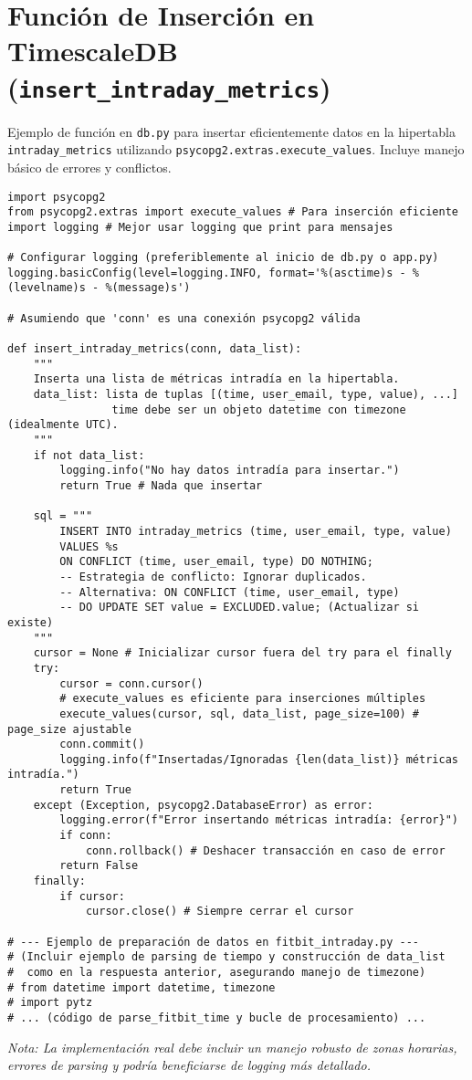 \section{Función de Inserción en TimescaleDB (\texttt{insert\_intraday\_metrics})}
\label{annex:code:insert_intraday}
Ejemplo de función en \texttt{db.py} para insertar eficientemente datos en la hipertabla \texttt{intraday\_metrics} utilizando \texttt{psycopg2.extras.execute\_values}. Incluye manejo básico de errores y conflictos.
\begin{lstlisting}[caption={Ejemplo de función de inserción masiva en TimescaleDB (\texttt{db.py}).}, label={lst:insert_intraday_code}]
import psycopg2
from psycopg2.extras import execute_values # Para inserción eficiente
import logging # Mejor usar logging que print para mensajes

# Configurar logging (preferiblemente al inicio de db.py o app.py)
logging.basicConfig(level=logging.INFO, format='%(asctime)s - %(levelname)s - %(message)s')

# Asumiendo que 'conn' es una conexión psycopg2 válida

def insert_intraday_metrics(conn, data_list):
    """
    Inserta una lista de métricas intradía en la hipertabla.
    data_list: lista de tuplas [(time, user_email, type, value), ...]
                time debe ser un objeto datetime con timezone (idealmente UTC).
    """
    if not data_list:
        logging.info("No hay datos intradía para insertar.")
        return True # Nada que insertar

    sql = """
        INSERT INTO intraday_metrics (time, user_email, type, value)
        VALUES %s
        ON CONFLICT (time, user_email, type) DO NOTHING;
        -- Estrategia de conflicto: Ignorar duplicados.
        -- Alternativa: ON CONFLICT (time, user_email, type)
        -- DO UPDATE SET value = EXCLUDED.value; (Actualizar si existe)
    """
    cursor = None # Inicializar cursor fuera del try para el finally
    try:
        cursor = conn.cursor()
        # execute_values es eficiente para inserciones múltiples
        execute_values(cursor, sql, data_list, page_size=100) # page_size ajustable
        conn.commit()
        logging.info(f"Insertadas/Ignoradas {len(data_list)} métricas intradía.")
        return True
    except (Exception, psycopg2.DatabaseError) as error:
        logging.error(f"Error insertando métricas intradía: {error}")
        if conn:
            conn.rollback() # Deshacer transacción en caso de error
        return False
    finally:
        if cursor:
            cursor.close() # Siempre cerrar el cursor

# --- Ejemplo de preparación de datos en fitbit_intraday.py ---
# (Incluir ejemplo de parsing de tiempo y construcción de data_list
#  como en la respuesta anterior, asegurando manejo de timezone)
# from datetime import datetime, timezone
# import pytz
# ... (código de parse_fitbit_time y bucle de procesamiento) ...
\end{lstlisting}
\textit{Nota: La implementación real debe incluir un manejo robusto de zonas horarias, errores de parsing y podría beneficiarse de logging más detallado.}

